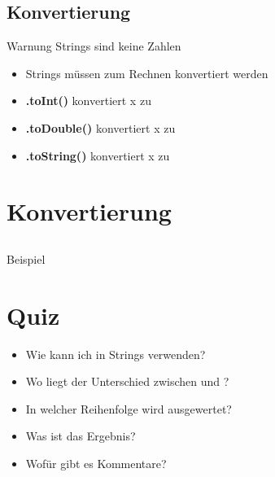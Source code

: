 \subsection{Konvertierung}
\begin{frame}
    \slidehead
    \begin{block}{Warnung}
        Strings sind keine Zahlen
    \end{block}


    \pause

    \begin{itemize}[<+->]
        \item Strings müssen zum Rechnen konvertiert werden
        \item \textbf{.toInt()} konvertiert x zu 
        \item \textbf{.toDouble()} konvertiert x zu 
        \item \textbf{.toString()} konvertiert x zu 
    \end{itemize}

\end{frame}

\section{Konvertierung}
\subsection{}
\begin{frame}
    \slidehead
    \begin{block}{Beispiel}
    \end{block}
\end{frame}

\livecoding

\section{Quiz}
\begin{frame}
    \slidehead
    \begin{itemize}[<+->]
        \item Wie kann ich  in Strings verwenden?
        \item Wo liegt der Unterschied zwischen  und ?
        \item In welcher Reihenfolge wird  ausgewertet?
        \item Was ist das Ergebnis?
        \item Wofür gibt es Kommentare?
    \end{itemize}
\end{frame}



